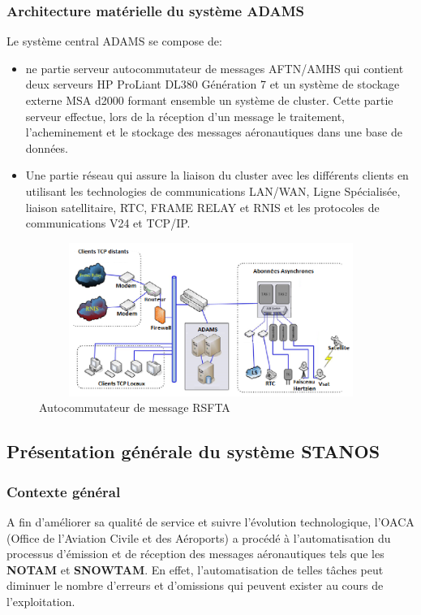 \subsubsection{Architecture matérielle du système ADAMS}
Le système central ADAMS se compose de:\\ 
\begin{itemize}
\item ne partie serveur autocommutateur de messages AFTN/AMHS  qui contient deux serveurs HP ProLiant DL380 Génération 7 et un système de stockage externe MSA d2000 formant ensemble un système de cluster. Cette partie serveur effectue, lors de la réception d’un message le traitement, l’acheminement et le stockage des messages aéronautiques dans une base de données. \\
\item Une partie réseau qui assure la liaison du cluster avec les différents clients en utilisant les technologies de communications LAN/WAN, Ligne Spécialisée, liaison satellitaire, RTC, FRAME RELAY et RNIS et les protocoles de communications V24 et TCP/IP. \\
\end{itemize}
\begin{figure}[!h]
\begin{center}
\includegraphics[width=13cm,height=5cm]{existant/architecture.png}
\end{center}
\caption{Autocommutateur de message RSFTA}
\end{figure}



\subsection{Présentation générale du système STANOS}
\subsubsection{Contexte général}
A fin d’améliorer sa qualité de service et suivre l’évolution technologique, l’OACA (Office de l’Aviation Civile et des Aéroports) a procédé à l’automatisation du processus d’émission et de réception des messages aéronautiques tels que les \textbf{NOTAM} et \textbf{SNOWTAM}. En effet, l’automatisation de telles tâches peut diminuer le nombre d’erreurs et d’omissions qui peuvent exister au cours de l’exploitation. \\

